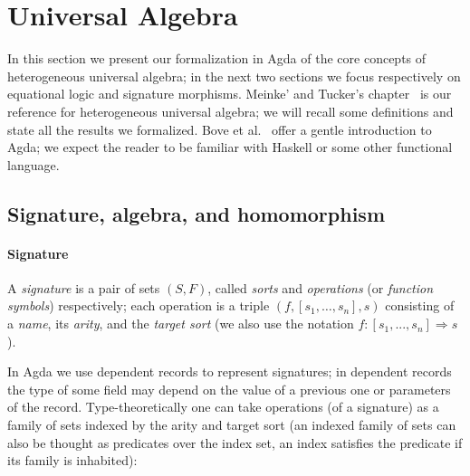 \section{Universal Algebra}
\label{sec:univ-alg}

In this section we present our formalization in Agda of the core
concepts of heterogeneous universal algebra; in the next two sections
we focus respectively on equational logic and signature morphisms.
Meinke' and Tucker's chapter~\cite{meinke-tucker-1992} is our
reference for heterogeneous universal algebra; we will recall some
definitions and state all the results we formalized. Bove et
al.~\cite{agda-intro} offer a gentle introduction to Agda; we expect
the reader to be familiar with Haskell or some other functional
language.

\subsection{Signature, algebra, and homomorphism}

\paragraph*{Signature}

A \emph{signature} is a pair of sets $(S,F)$, called \textit{sorts}
and \textit{operations} (or \textit{function symbols}) respectively;
each operation is a triple $(f,[s_1,\ldots,s_n],s)$ consisting of a
\textit{name}, its \textit{arity}, and the \textit{target sort} (we
also use the notation $f \colon [s_1,...,s_n] \Rightarrow s$).

In Agda we use dependent records to represent signatures; in dependent
records the type of some field may depend on the value of a previous
one or parameters of the record. Type-theoretically one can take
operations (of a signature) as a family of sets indexed by the arity and target sort
(an indexed family of sets can also be thought as predicates over the
index set, an index satisfies the predicate if its family is
inhabited):
\begin{code}
\>[0]\AgdaSpace{}%
\AgdaSpace{}%
\AgdaSymbol{:}\AgdaSpace{}%
\AgdaSpace{}%
\<%
\\
\>[0][@{}l@{\AgdaIndent{0}}]%
\>[2]\<%
\\
\>[2][@{}l@{\AgdaIndent{0}}]%
\>[4]%
\>[11]\AgdaSymbol{:}\AgdaSpace{}%
\<%
\\
%
\>[4]%
\>[11]\AgdaSymbol{:}\AgdaSpace{}%
\AgdaSymbol{(}\AgdaSpace{}%
\AgdaSymbol{)}\AgdaSpace{}%
\AgdaSpace{}%
\AgdaSpace{}%
\AgdaSpace{}%
\<%
\end{code}

